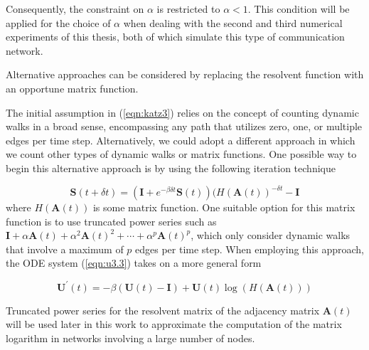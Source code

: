 Consequently, the constraint on $\alpha$ is restricted to $\alpha<1$. This condition will be applied for the choice of $\alpha$ when dealing with the second and third numerical experiments of this thesis, both of which simulate this type of communication network.

\newpage

\begin{highlightedParagraphC}

Alternative approaches can be considered by replacing the resolvent function with an opportune matrix function.
 

\end{highlightedParagraphC}

The initial assumption in (\ref{eqn:katz3}) relies on the concept of counting dynamic walks in a broad sense, encompassing any path that utilizes zero, one, or multiple edges per time step. Alternatively, we could adopt a different approach in which we count other types of dynamic walks or matrix functions. One possible way to begin this alternative approach is by using the following iteration technique

\begin{equation}
\label{eqn:remarks1}
    \mathbf{S}(t + \delta t) = (\mathbf{I} + e^{-\beta\delta t}\mathbf{S}(t)) (H(\mathbf{A}(t))^{-\delta t} - \mathbf{I}
\end{equation}
where $H(\mathbf{A}(t))$ is some matrix function. One suitable option for this matrix function is to use truncated power series such as $\mathbf{I} + \alpha \mathbf{A}(t) + \alpha^2 \mathbf{A}(t)^2 + \cdots + \alpha^p \mathbf{A}(t)^p$, which only consider dynamic walks that involve a maximum of $p$ edges per time step. When employing this approach, the ODE system (\ref{eqn:u3.3}) takes on a more general form 

\begin{equation}
\label{eqn:remarks2}
    \mathbf{U^{\prime}}(t) = -\beta (\mathbf{U}(t) - \mathbf{I}) + \mathbf{U}(t)\log (H(\mathbf{A}(t)))
\end{equation}

Truncated power series for the resolvent matrix of the adjacency matrix $\mathbf{A}(t)$ will be used later in this work to approximate the computation of the matrix logarithm in networks involving a large number of nodes.








